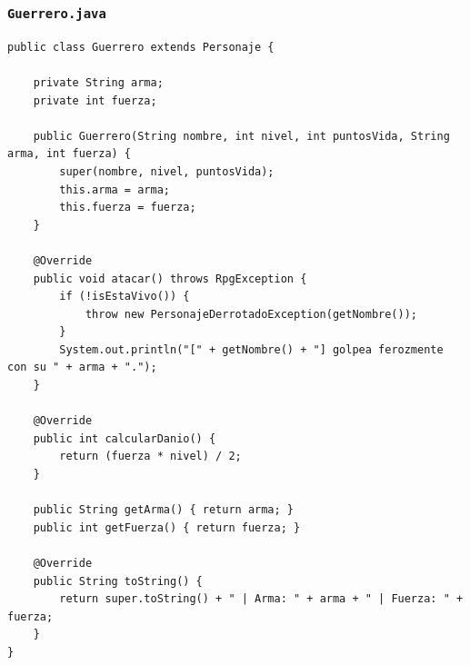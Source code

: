 \documentclass[11pt,letterpaper]{article}
\begin{document}
\subsubsection{\texttt{Guerrero.java}}
\begin{lstlisting}[style=JavaStyle]
public class Guerrero extends Personaje {

    private String arma;
    private int fuerza;

    public Guerrero(String nombre, int nivel, int puntosVida, String arma, int fuerza) {
        super(nombre, nivel, puntosVida);
        this.arma = arma;
        this.fuerza = fuerza;
    }

    @Override
    public void atacar() throws RpgException {
        if (!isEstaVivo()) {
            throw new PersonajeDerrotadoException(getNombre());
        }
        System.out.println("[" + getNombre() + "] golpea ferozmente con su " + arma + ".");
    }

    @Override
    public int calcularDanio() {
        return (fuerza * nivel) / 2;
    }

    public String getArma() { return arma; }
    public int getFuerza() { return fuerza; }

    @Override
    public String toString() {
        return super.toString() + " | Arma: " + arma + " | Fuerza: " + fuerza;
    }
}
\end{lstlisting}
\end{document}
